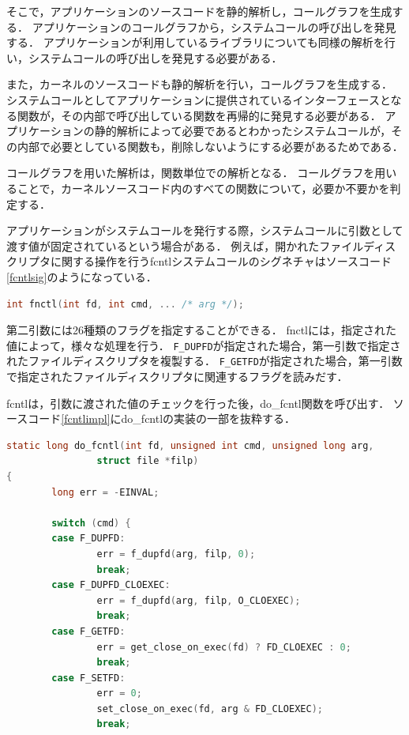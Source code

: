\documentclass[graduation-thesis]{mlarticle}
\begin{document}
そこで，アプリケーションのソースコードを静的解析し，コールグラフを生成する．
アプリケーションのコールグラフから，システムコールの呼び出しを発見する．
アプリケーションが利用しているライブラリについても同様の解析を行い，システムコールの呼び出しを発見する必要がある．

また，カーネルのソースコードも静的解析を行い，コールグラフを生成する．
システムコールとしてアプリケーションに提供されているインターフェースとなる関数が，その内部で呼び出している関数を再帰的に発見する必要がある．
アプリケーションの静的解析によって必要であるとわかったシステムコールが，その内部で必要としている関数も，削除しないようにする必要があるためである．

コールグラフを用いた解析は，関数単位での解析となる．
コールグラフを用いることで，カーネルソースコード内のすべての関数について，必要か不要かを判定する．

アプリケーションがシステムコールを発行する際，システムコールに引数として渡す値が固定されているという場合がある．
例えば，開かれたファイルディスクリプタに関する操作を行うfcntlシステムコールのシグネチャはソースコード\ref{fcntlsig}のようになっている．

\begin{lstlisting}[language=C, caption=fcntlシステムコールのシグネチャ, label=fcntlsig]
  int fnctl(int fd, int cmd, ... /* arg */);
\end{lstlisting}

第二引数には26種類のフラグを指定することができる．
fnctlには，指定された値によって，様々な処理を行う．
\texttt{F\_DUPFD}が指定された場合，第一引数で指定されたファイルディスクリプタを複製する．
\texttt{F\_GETFD}が指定された場合，第一引数で指定されたファイルディスクリプタに関連するフラグを読みだす．

fcntlは，引数に渡された値のチェックを行った後，do\_fcntl関数を呼び出す．
ソースコード\ref{fcntlimpl}にdo\_fcntlの実装の一部を抜粋する．

\begin{lstlisting}[language=C, caption=do\_fcntlの実装(抜粋), label=fcntlimpl]
static long do_fcntl(int fd, unsigned int cmd, unsigned long arg,
                struct file *filp)
{
        long err = -EINVAL;

        switch (cmd) {
        case F_DUPFD:
                err = f_dupfd(arg, filp, 0);
                break;
        case F_DUPFD_CLOEXEC:
                err = f_dupfd(arg, filp, O_CLOEXEC);
                break;
        case F_GETFD:
                err = get_close_on_exec(fd) ? FD_CLOEXEC : 0;
                break;
        case F_SETFD:
                err = 0;
                set_close_on_exec(fd, arg & FD_CLOEXEC);
                break;
\end{lstlisting}
\end{document}
